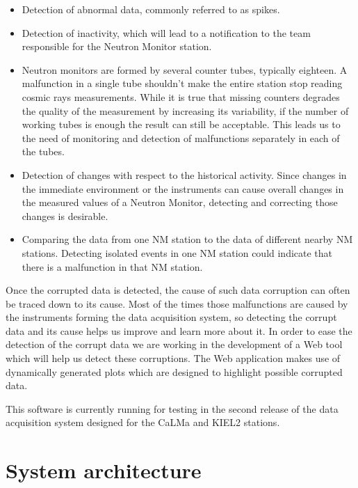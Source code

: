 \documentclass[a4paper]{jpconf}
\begin{document}
\begin{itemize}
	\item   Detection of abnormal data, commonly referred to as spikes.
    \item   Detection of inactivity, which will lead to a notification to the
        team responsible for the Neutron Monitor station.
    \item Neutron monitors are formed by several counter tubes, typically
        eighteen. A malfunction in a single tube shouldn't make the entire
        station stop reading cosmic rays measurements. While it is true that
        missing counters degrades the quality of the measurement by increasing its
        variability, if the number of working tubes is enough the result can
        still be acceptable. This leads us to the need of monitoring and
        detection of malfunctions separately in each of the tubes.  
    \item Detection of changes with respect to the historical activity.
        Since changes in the immediate environment or the instruments can cause
        overall changes in the measured values of a Neutron Monitor, detecting
        and correcting those changes is desirable.
    \item Comparing the data from one NM station to the data of different
        nearby NM stations. Detecting isolated events in one NM station
        could indicate that there is a malfunction in that NM station.	
\end{itemize}

Once the corrupted data is detected, the cause of such data corruption can often 
be traced down to its cause. Most of the times those malfunctions are caused by the instruments
forming the data acquisition system, so detecting the corrupt data and its cause
helps us improve and learn more about it. In order
to ease the detection of the corrupt data we are working in the
development of a Web tool which will help us detect these corruptions. The Web
application makes use of dynamically generated plots which are designed to highlight
possible corrupted data.

This software is currently running for testing in the second release of the data
acquisition system\cite{Garcia2014} designed for the CaLMa\cite{Medina2013} and
KIEL2 stations.


\section{System architecture}
\end{document}
